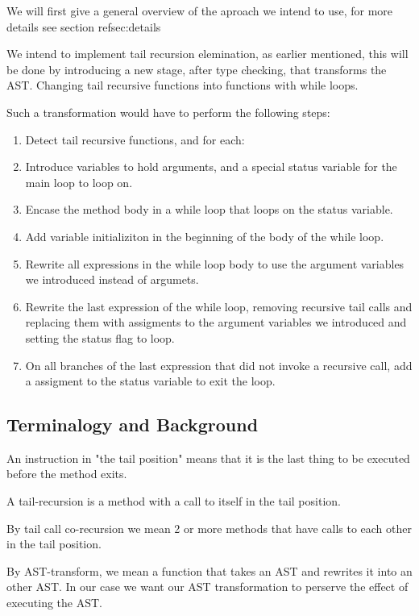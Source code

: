 We will first give a general overview of the aproach we intend to use, for more details see section ref{sec:details}

We intend to implement tail recursion elemination, as earlier mentioned, this will be done by introducing a new stage, after type checking, that transforms the AST. Changing tail recursive functions into functions with while loops.

Such a transformation would have to perform the following steps:

\begin{enumerate}
    \item Detect tail recursive functions, and for each:
    \item Introduce variables to hold arguments, and a special status variable for the main loop to loop on.
    \item Encase the method body in a while loop that loops on the status variable.
    \item Add variable initializiton in the beginning of the body of the while loop.
    \item Rewrite all expressions in the while loop body to use the argument variables we introduced instead of argumets. 
    \item Rewrite the last expression of the while loop, removing recursive tail calls and replacing them with assigments to the argument variables we introduced and setting the status flag to loop.
    \item On all branches of the last expression that did not invoke a recursive call, add a assigment to the status variable to exit the loop.
\end{enumerate}




\subsection{Terminalogy and Background}
An instruction in "the tail position" means that it is the last thing to be executed before the method exits.

A tail-recursion is a method with a call to itself in the tail position.

By tail call co-recursion we mean 2 or more methods that have calls to each other in the tail position.

By AST-transform, we mean a function that takes an AST and rewrites it into an other AST. In our case we want our AST transformation to perserve the effect of executing the AST.

